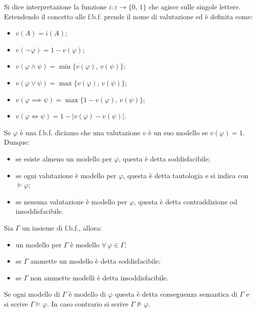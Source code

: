\documentclass[10pt]{article}
\begin{document}
        Si dice interpretazione la funzione \(i : \varepsilon \to \{0, \, 1\}\) che agisce sulle singole lettere. Estendendo il concetto
        alle f.b.f. prende il nome di valutazione ed è definita come:
        \begin{itemize}
            \item \(v(A) = i(A)\);
            \item \(v(\neg \, \varphi) = 1 - v(\varphi)\);
            \item \(v(\varphi \land \psi) = \min\{v(\varphi), \, v(\psi)\}\);
            \item \(v(\varphi \lor \psi) = \max\{v(\varphi), \, v(\psi)\}\);
            \item \(v(\varphi \implies \psi) = \max\{1 - v(\varphi), \, v(\psi)\}\);
            \item \(v(\varphi \iff \psi) = 1 - \left|v(\varphi) - v(\psi)\right|\).
        \end{itemize}

        Se \(\varphi\) è una f.b.f. diciamo che una valutazione \(v\) è un suo modello se \(v(\varphi) = 1\). Dunque:
        \begin{itemize}
            \item se esiste almeno un modello per \(\varphi\), questa è detta soddisfacibile;
            \item se ogni valutazione è modello per \(\varphi\), questa è detta tautologia e si indica con \(\models \varphi\);
            \item se nessuna valutazione è modello per \(\varphi\), questa è detta contraddizione od insoddisfacibile.
        \end{itemize}

        Sia \(\Gamma\) un insieme di f.b.f., allora:
        \begin{itemize}
            \item un modello per \(\Gamma\) è modello \(\forall \, \varphi \in \Gamma\);
            \item se \(\Gamma\) ammette un modello è detta soddisfacibile;
            \item se \(\Gamma\) non ammette modelli è detta insoddisfacibile.
        \end{itemize}

        Se ogni modello di \(\Gamma\) è modello di \(\varphi\) questa è detta conseguenza semantica di \(\Gamma\) e si scrive
        \(\Gamma \models \varphi\). In caso contrario si scrive \(\Gamma \not\models \varphi\).
\end{document}

